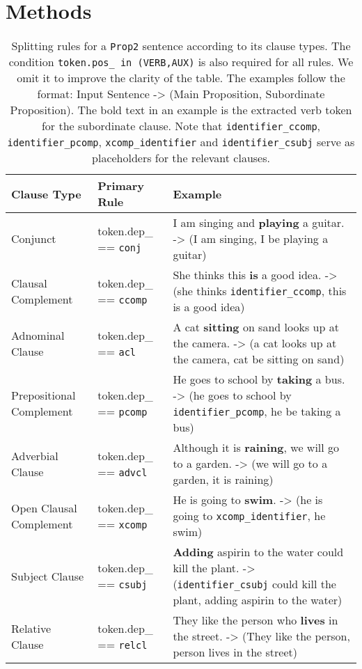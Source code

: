 \section{Methods}


\begin{table*}[h!]
\centering
\small 
\renewcommand{\arraystretch}{1.5}
\begin{tabular}{@{}>{\raggedright\arraybackslash}p{2.5cm}>{\raggedright\arraybackslash}p{2.8cm}>{\raggedright\arraybackslash}p{9cm}@{}}
\toprule
\textbf{Clause Type} & \textbf{Primary Rule} & \textbf{Example} \\ \midrule
Conjunct & token.dep\_ == \texttt{conj} & I am singing and \textbf{playing} a guitar. -> (I am singing, I be playing a guitar) \\
\midrule
Clausal Complement & token.dep\_ == \texttt{ccomp} & She thinks this \textbf{is} a good idea. -> (she thinks \texttt{identifier\_ccomp}, this is a good idea) \\
\midrule
Adnominal Clause & token.dep\_ ==  \texttt{acl} & A cat \textbf{sitting} on sand looks up at the camera. -> (a cat looks up at the camera, cat be sitting on sand) \\
\midrule
Prepositional Complement & token.dep\_ == \texttt{pcomp} & He goes to school by \textbf{taking} a bus. -> (he goes to school by \texttt{identifier\_pcomp}, he be taking a bus) \\
\midrule
Adverbial Clause & token.dep\_ == \texttt{advcl} & Although it is \textbf{raining}, we will go to a garden. -> (we will go to a garden, it is raining) \\
\midrule
Open Clausal Complement & token.dep\_ == \texttt{xcomp} & He is going to \textbf{swim}. -> (he is going to \texttt{xcomp\_identifier}, he swim) \\
\midrule
Subject Clause & token.dep\_ == \texttt{csubj} & \textbf{Adding} aspirin to the water could kill the plant. -> (\texttt{identifier\_csubj} could kill the plant, adding aspirin to the water) \\
\midrule
Relative Clause & token.dep\_ == \texttt{relcl} & They like the person who \textbf{lives} in the street. -> (They like the person, person lives in the street) \\ 
\bottomrule
\end{tabular}
\caption{Splitting rules for a \texttt{Prop2} sentence according to its clause types. The condition \texttt{token.pos\_ in (\texttt{VERB},\texttt{AUX})} is also required for all rules. We omit it to improve the clarity of the table. The examples follow the format: Input Sentence -> (Main Proposition, Subordinate Proposition). The bold text in an example is the extracted verb token for the subordinate clause. Note that \texttt{identifier\_ccomp}, \texttt{identifier\_pcomp}, \texttt{xcomp\_identifier} and \texttt{identifier\_csubj} serve as placeholders for the relevant clauses.  
} 
\label{tab:splitting_rules_cs2v}
\end{table*}

